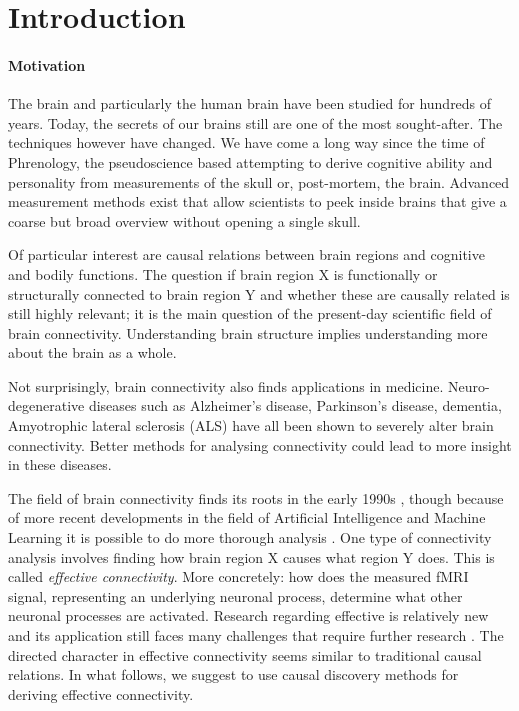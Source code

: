 \documentclass[a4paper, 10pt, english, onecolumn]{article}
\title{\fontfamily{phv}\selectfont{Causal Discovery methods for Effective Connectivity}}
\author{
  \textbf{R. Janssen} - \href{mailto:ramon.janssen@student.ru.nl}{ramon.janssen@student.ru.nl} \\
  \textbf{T. de Ruijter} - \href{mailto:t.deruijter@student.ru.nl}{t.deruijter@student.ru.nl}\\
}
\date{\fontfamily{ptm}\selectfont{\small{\bfseries{\today - Radboud
Universiteit Nijmegen}}}\\[0.5cm]\rule{\linewidth}{0.3mm}}
\begin{document}
\maketitle

\setlength{\parindent}{0.0cm}
\setlength{\parskip}{0.25cm}

\begin{abstract}
\end{abstract}


\section{Introduction}

\paragraph{Motivation}
The brain and particularly the human brain have been studied for hundreds of years.
Today, the secrets of our brains still are one of the most sought-after.
The techniques however have changed.
We have come a long way since the time of Phrenology, the pseudoscience based attempting to derive cognitive ability and personality from measurements of the skull or, post-mortem, the brain.
Advanced measurement methods exist that allow scientists to peek inside brains that give a coarse but broad overview without opening a single skull.

Of particular interest are causal relations between brain regions and cognitive and bodily functions.
The question if brain region X is functionally or structurally connected to brain region Y and whether these are causally related is still highly relevant; it is the main question of the present-day scientific field of brain connectivity.
Understanding brain structure implies understanding more about the brain as a whole.

Not surprisingly, brain connectivity also finds applications in medicine.
Neuro-degenerative diseases such as Alzheimer's disease, Parkinson's disease, dementia, Amyotrophic lateral sclerosis (ALS) have all been shown to severely alter brain connectivity. %
Better methods for analysing connectivity could lead to more insight in these diseases.

The field of brain connectivity finds its roots in the early 1990s \cite{friston1993functional, friston1994}, though because of more recent developments in the field of Artificial Intelligence and Machine Learning it is possible to do more thorough analysis \cite{vandenheuvel2010}.
One type of connectivity analysis involves finding how brain region X causes what region Y does. This is called \emph{effective connectivity}.
More concretely: how does the measured fMRI signal, representing an underlying neuronal process, determine what other neuronal processes are activated.
Research regarding effective is relatively new and its application still faces many challenges that require further research \cite{ramsey2010}.
The directed character in effective connectivity seems similar to traditional causal relations.
In what follows, we suggest to use causal discovery methods for deriving effective connectivity.
\end{document}
